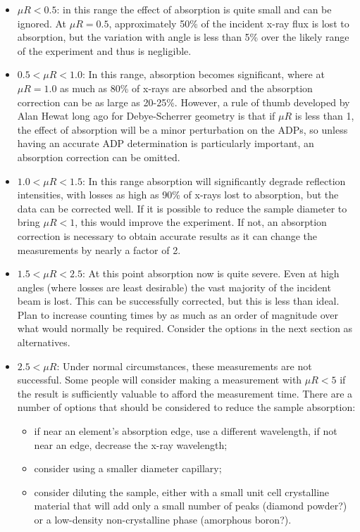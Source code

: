  \begin{itemize}
     \item $\mu R < 0.5$: in this range the effect of absorption is quite small and can be ignored. At $\mu R = 0.5$, approximately 50\% of the incident x-ray flux is lost to absorption, but the variation with angle is less than 5\% over the likely range of the experiment and thus is negligible. 
     \item $0.5 < \mu R < 1.0$: In this range, absorption becomes significant, where at $\mu R = 1.0$ as much as 80\% of x-rays are absorbed and the absorption correction can be as large as 20-25\%. However, a rule of thumb developed by Alan Hewat long ago for Debye-Scherrer geometry is that if $\mu R$ is less than 1, the effect of absorption will be a minor perturbation on the ADPs, so unless having an accurate ADP determination is particularly important, an absorption correction can be omitted.  
     \item      $1.0 < \mu R < 1.5$: In this range absorption will significantly degrade reflection intensities, with losses as high as 90\% of x-rays lost to absorption, but the data can be corrected well. If it is possible to reduce the sample diameter to bring $\mu R < 1$, this would improve the experiment. If not, an absorption correction is necessary to obtain accurate results as it can change the measurements by nearly a factor of 2.
     \item $1.5 < \mu R < 2.5$: At this point absorption now is quite severe. Even at high angles (where losses are least desirable) the vast majority of the incident beam is lost. This can be successfully corrected, but this is less than ideal. Plan to increase counting times by as much as an order of magnitude over what would normally be required. Consider the options in the next section as alternatives. 
     \item $2.5 < \mu R$: Under normal circumstances, these measurements are not successful. Some people will consider making a measurement with $\mu R < 5$ if the result is sufficiently valuable to afford the measurement time. There are a number of options that should be considered to reduce the sample absorption: 
     \begin{itemize}
         \item if near an element's absorption edge, use a different wavelength, if not near an edge, decrease the x-ray wavelength;
         \item consider using a smaller diameter capillary;
         \item consider diluting the sample, either with a small unit cell crystalline material that will add only a small number of peaks (diamond powder?) or a low-density non-crystalline phase (amorphous boron?). 
     \end{itemize}
 \end{itemize}

